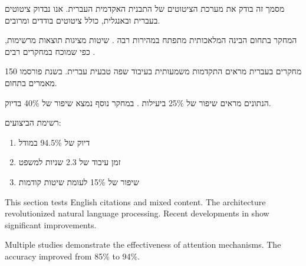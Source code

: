 \documentclass{hebrew-academic-template}
\date{\textenglish{September 2025}}
\begin{document}
\maketitle

\tableofcontents
\newpage



מסמך זה בודק את מערכת הציטוטים של התבנית האקדמית העברית. אנו נבדוק ציטוטים בעברית ובאנגלית, כולל ציטוטים בודדים ומרובים.


המחקר בתחום הבינה המלאכותית מתפתח במהירות רבה \cite{devlin2018bert}. שיטות  מציגות תוצאות מרשימות, כפי שמוכח במחקרים רבים \cite{vaswani2017attention,hebrew_nlp_2023}.

מחקרים בעברית \cite{hebrew_nlp_2023,hebrew_linguistics_2022} מראים התקדמות משמעותית בעיבוד שפה טבעית עברית. בשנת  פורסמו \num{150} מאמרים בתחום.


הנתונים מראים שיפור של \num{25}\% ביעילות \cite{devlin2018bert}. במחקר נוסף \cite{vaswani2017attention} נמצא שיפור של \num{40}\% בדיוק.

רשימת הביצועים:
\begin{enumerate}
    \item דיוק של \num{94.5}\% במודל  \cite{devlin2018bert}
    \item זמן עיבוד של \num{2.3} שניות למשפט
    \item שיפור של \num{15}\% לעומת שיטות קודמות \cite{hebrew_nlp_2023}
\end{enumerate}



This section tests English citations and mixed content. The  architecture \cite{vaswani2017attention} revolutionized natural language processing. Recent developments in  \cite{devlin2018bert} show significant improvements.

Multiple studies \cite{vaswani2017attention,devlin2018bert,hebrew_nlp_2023} demonstrate the effectiveness of attention mechanisms. The accuracy improved from \num{85}\% to \num{94}\%.
\end{document}

